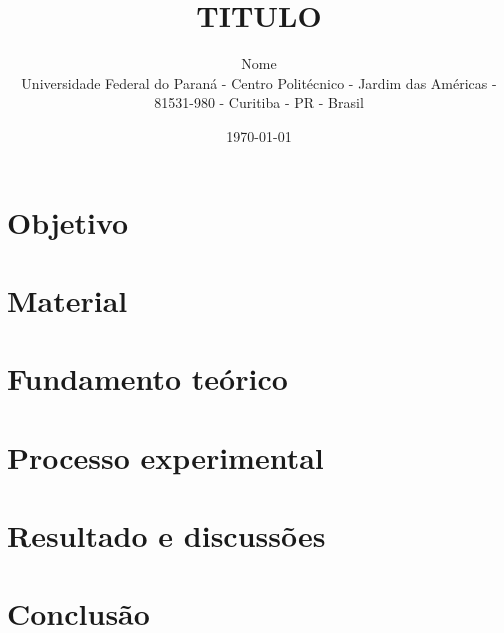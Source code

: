 \documentclass[12pt, twocolumn, a4paper]{article}
\title{TITULO}
\author{Nome\\ \small Universidade Federal do Paraná - Centro Politécnico - Jardim das Américas -\\ \small 81531-980 - Curitiba - PR - Brasil}
\date{\today}
\begin{document}
\maketitle

\section{Objetivo}

\section{Material}

\section{Fundamento teórico}

\section{Processo experimental}

\section{Resultado e discussões}

\section{Conclusão}

\nocite{apostila, sears}
\def\bibname{Referência}

\end{document}
